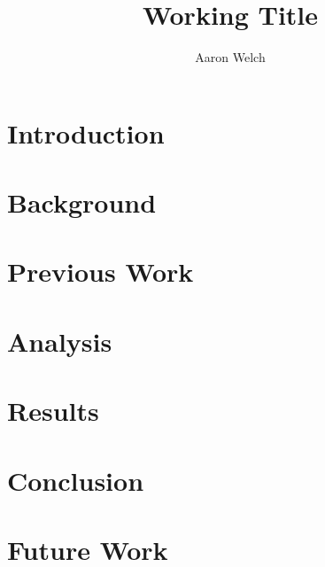 \documentclass[runningheads]{llncs}
\begin{document}
\title{Working Title}
\author{Aaron Welch}
\maketitle
\begin{abstract}

\end{abstract}
\section{Introduction}
\label{sec:intro}

\section{Background}
\label{sec:background}
\section{Previous Work}
\label{sec:prevwork}

\section{Analysis}
\label{sec:analysis}

\section{Results}
\label{sec:results}
\section{Conclusion}
\label{sec:conclusion}
\section{Future Work}
\label{sec:future}


\end{document}
